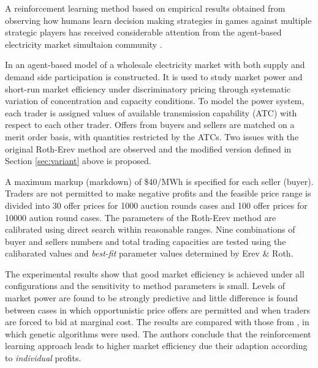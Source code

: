 A reinforcement learning method based on empirical results obtained from
observing how humans learn decision making strategies in games against multiple
strategic players has received considerable attention from the agent-based
electricity market simultaion community \cite{roth:games,roth:aer}.

In \cite{nicolaisen:2001} an agent-based model of a wholesale electricity market
with both supply and demand side participation is constructed.  It is used to
study market power and short-run market efficiency under discriminatory pricing
through systematic variation of concentration and capacity conditions.  To model
the power system, each trader is assigned values of available transmission
capability (ATC) with respect to each other trader.  Offers from buyers and
sellers are matched on a merit order basis, with quantities restricted by
the ATCs.  Two issues with the original Roth-Erev method are observed and the
modified version defined in Section \ref{sec:variant} above is proposed.

A maximum markup (markdown) of \$40/MWh is specified for each seller (buyer).
Traders are not permitted to make negative profits and the feasible price range
is divided into 30 offer prices for 1000 auction rounds cases and 100 offer
prices for 10000 aution round cases.  The parameters of the Roth-Erev method are
calibrated using direct search within reasonable ranges.  Nine combinations of
buyer and sellers numbers and total trading capacities are tested using the
calibarated values and \textit{best-fit} parameter values determined by Erev \&
Roth.

The experimental results show that good market efficiency is achieved under all
configurations and the sensitivity to method parameters is small.  Levels of
market power are found to be strongly predictive and little difference is found
between cases in which opportunistic price offers are permitted and when traders
are forced to bid at marginal cost.  The results are compared with those from
\cite{nicolaisen:2000}, in which genetic algorithms were used.  The authors
conclude that the reinforcement learning approach leads to higher market
efficiency due their adaption according to \textit{individual} profits.

